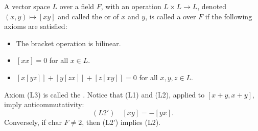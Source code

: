 A vector space $L$ over a field $F$, with an operation $L \times L \rightarrow L$, denoted $(x, y) \mapsto [xy]$ and called the  or  of $x$ and $y$, is called a  over $F$ if the following axioms are satisfied:

\begin{itemize}
\item[(L1)] The bracket operation is bilinear.
\item[(L2)] $[xx] = 0$ for all $x \in L$.
\item[(L3)] $[x[yz]] + [y[zx]] + [z[xy]] = 0$ for all $x, y, z \in L$.
\end{itemize}

Axiom (L3) is called the . Notice that (L1) and (L2), applied to $[x+y, x+y]$, imply anticommutativity:
$$(L2') \quad [xy] = -[yx].$$
Conversely, if $\text{char } F \neq 2$, then (L2') implies (L2).
